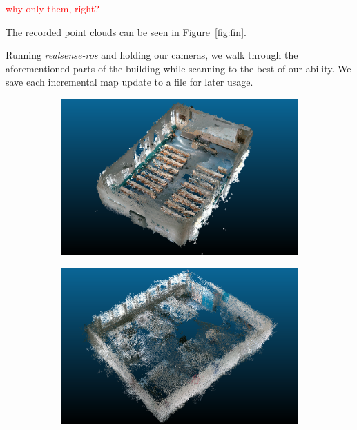 \documentclass[main.tex]{subfiles}
\begin{document}
\textcolor{red}{why only them, right?} %

The recorded point clouds can be seen in Figure~\ref{fig:fin}.


Running \textit{realsense-ros} and holding our cameras, we walk through the aforementioned parts of the building while scanning to the best of our ability.
We save each incremental map update to a file for later usage.

\begin{figure}[H]
    \begin{subfigure}{0.5\textwidth}
        \centering
        \includegraphics[width=.9\linewidth]{images/307.png}
        \caption[Dynamic Dataset - auditorium]{}
        \label{fig:fin307}
    \end{subfigure}
    \begin{subfigure}{0.5\textwidth}
        \centering
        \includegraphics[width=.9\linewidth]{images/333.png}
        \caption[Dynamic Dataset - conference room]{}
        \label{fig:fin333}
    \end{subfigure}

\end{figure}
\end{document}
